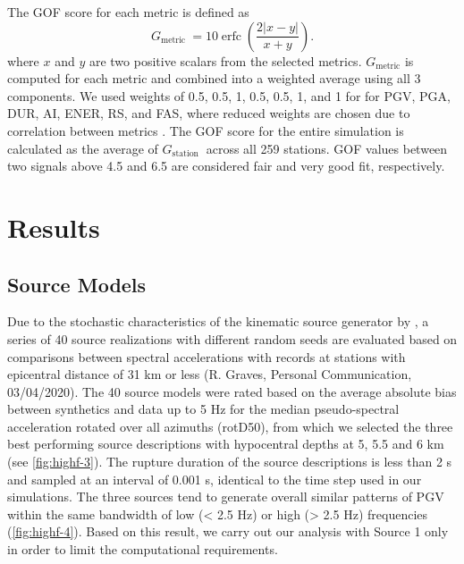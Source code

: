 The GOF score for each metric is defined as
\begin{equation}\label{qe:highf-4}
  G_{\text {metric }}=10 \operatorname{erfc}\left(\dfrac{2|x-y|}{x+y}\right).
\end{equation}
\noindent where $x$ and $y$ are two positive scalars from the selected metrics. $G_{\text {metric}}$ is computed for each metric and combined into a weighted average using all 3 components. We used weights of 0.5, 0.5, 1, 0.5, 0.5, 1, and 1 for for PGV, PGA, DUR, AI, ENER, RS, and FAS, where reduced weights are chosen due to correlation between metrics \citep{olsenGoodnessoffitCriteriaBroadband2010}. The GOF score for the entire simulation is calculated as the average of $G_{\text {station }}$ across all 259 stations. GOF values between two signals above 4.5 and 6.5 are considered fair and very good fit, respectively.

\section{Results}
\subsection{Source Models}
Due to the stochastic characteristics of the kinematic source generator by \citet{gravesKinematicGroundMotion2016}, a series of 40 source realizations with different random seeds are evaluated based on comparisons between spectral accelerations with records at stations with epicentral distance of 31 km or less (R. Graves, Personal Communication, 03/04/2020). The 40 source models were rated based on the average absolute bias between synthetics and data up to 5 Hz for the median pseudo-spectral acceleration rotated over all azimuths (rotD50), from which we selected the three best performing source descriptions with hypocentral depths at 5, 5.5 and 6 km (see \cref{fig:highf-3}). The rupture duration of the source descriptions is less than 2 s and sampled at an interval of 0.001 s, identical to the time step used in our simulations. The three sources tend to generate overall similar patterns of PGV within the same bandwidth of low (< 2.5 Hz) or high (> 2.5 Hz) frequencies (\cref{fig:highf-4}). Based on this result, we carry out our analysis with Source 1 only in order to limit the computational requirements.


